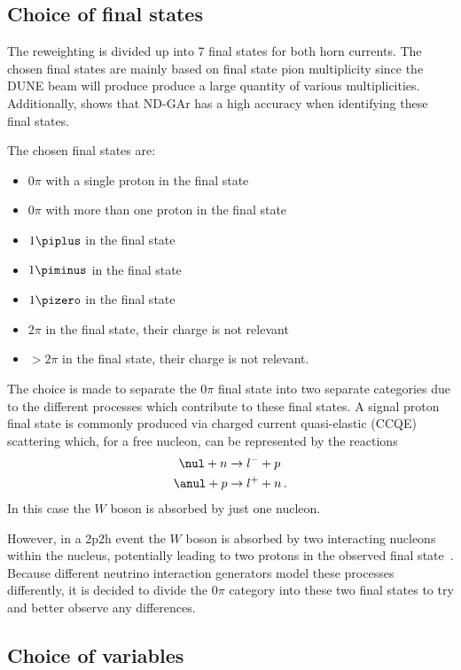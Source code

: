 \subsection{Choice of final states}
\label{sec:dune_ndrwt:rwt:states}

The reweighting is divided up into 7 final states for both horn currents.
The chosen final states are mainly based on final state pion multiplicity since the DUNE beam will produce produce a large quantity of various multiplicities.
Additionally,  shows that ND-GAr has a high accuracy when identifying these final states.

The chosen final states are:
\begin{itemize}
	\item $0\pi$ with a single proton in the final state
	\item $0\pi$ with more than one proton in the final state
	\item $1\piplus$ in the final state
	\item $1\piminus$ in the final state
	\item $1\pizero$ in the final state
	\item $2\pi$ in the final state, their charge is not relevant
	\item $>2\pi$ in the final state, their charge is not relevant.
\end{itemize}

The choice is made to separate the $0\pi$ final state into two separate categories due to the different processes which contribute to these final states.
A signal proton final state is commonly produced via charged current quasi-elastic (CCQE) scattering which, for a free nucleon, can be represented by the reactions
\begin{align}
	\nul + n &\rightarrow l^{-} + p \\
	\anul + p &\rightarrow l^{+} + n \, .
\end{align}
In this case the $W$ boson is absorbed by just one nucleon.

However, in a 2p2h event the $W$ boson is absorbed by two interacting nucleons within the nucleus, potentially leading to two protons in the observed final state~\cite{2p2h}.
Because different neutrino interaction generators model these processes differently, it is decided to divide the $0\pi$ category into these two final states to try and better observe any differences.

\subsection{Choice of variables}
\label{sec:dune_ndrwt:rwt:kinematics}

